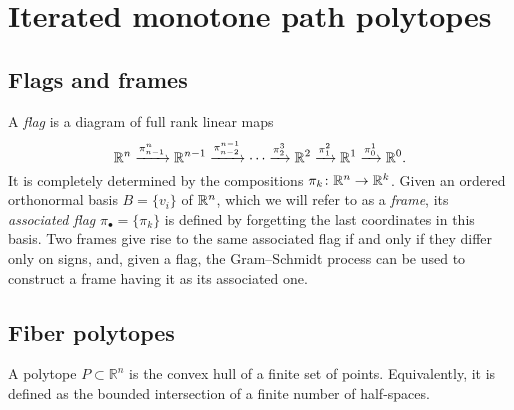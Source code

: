 
\section{Iterated monotone path polytopes}


\subsection{Flags and frames}

A \emph{flag} is a diagram of full rank linear maps
\[
\mathbb{R}^n \xrightarrow{\pi^n_{n-1}} \mathbb{R}^{n-1} \xrightarrow{\pi^{n-1}_{n-2}} \dotsb \xrightarrow{\pi^3_{2}} \mathbb{R}^2 \xrightarrow{\pi^2_1} \mathbb{R}^1 \xrightarrow{\pi^1_0} \mathbb{R}^0.
\]
It is completely determined by the compositions
$\pi_k \colon \mathbb{R}^n \to \mathbb{R}^k$.
Given an ordered orthonormal basis $B = \{v_i\}$ of $\mathbb{R}^n$, which we will refer to as a \textit{frame}, its \emph{associated flag} $\pi_\bullet = \{\pi_k\}$ is defined by forgetting the last coordinates in this basis.
Two frames give rise to the same associated flag if and only if they differ only on signs, and, given a flag, the Gram--Schmidt process can be used to construct a frame having it as its associated one.

%

\subsection{Fiber polytopes}

A polytope $P \subset \mathbb{R}^n$ is the convex hull of a finite set of points.
Equivalently, it is defined as the bounded intersection of a finite number of half-spaces.

